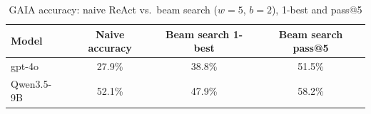 \documentclass{article}
\begin{document}
\begin{table}[h]
\centering
\caption{GAIA accuracy: naive ReAct vs.\ beam search ($w{=}5$, $b{=}2$), 1-best and pass@5}
\label{tab:beam-search-pass5}
\begin{tabular}{lccc}
\toprule
Model & Naive accuracy & Beam search 1-best & Beam search pass@5 \\
\midrule
gpt-4o      & 27.9\% & 38.8\% & 51.5\% \\
Qwen3.5-9B  & 52.1\% & 47.9\% & 58.2\% \\
\bottomrule
\end{tabular}
\end{table}
\end{document}
